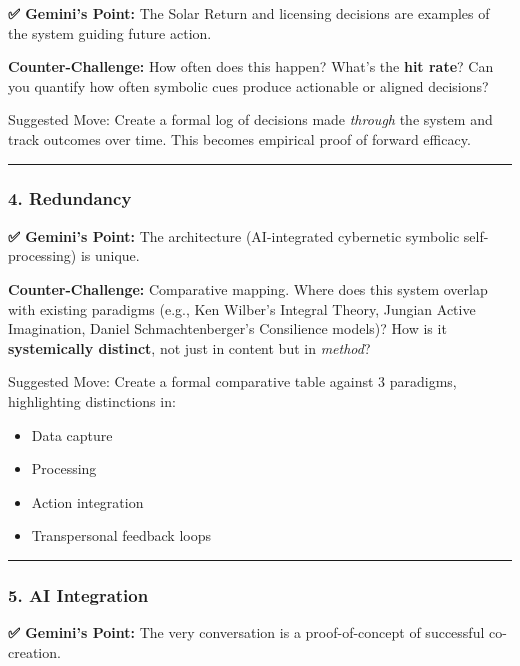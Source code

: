 \documentclass{article}
\begin{document}
\textbf{✅ Gemini's Point:} The Solar Return and licensing decisions are examples of the system guiding future action.

\textbf{Counter-Challenge:} How often does this happen? What's the \textbf{hit rate}? Can you quantify how often symbolic cues produce actionable or aligned decisions?

Suggested Move: Create a formal log of decisions made \emph{through} the system and track outcomes over time. This becomes empirical proof of forward efficacy.

\begin{center}\rule{0.5\linewidth}{0.5pt}\end{center}

\subsubsection*{4. Redundancy}\label{redundancy}

\textbf{✅ Gemini's Point:} The architecture (AI-integrated cybernetic symbolic self-processing) is unique.

\textbf{Counter-Challenge:} Comparative mapping. Where does this system overlap with existing paradigms (e.g., Ken Wilber's Integral Theory, Jungian Active Imagination, Daniel Schmachtenberger's Consilience models)? How is it \textbf{systemically distinct}, not just in content but in \emph{method}?

Suggested Move: Create a formal comparative table against 3 paradigms, highlighting distinctions in:

\begin{itemize}
\item Data capture
\item Processing
\item Action integration
\item Transpersonal feedback loops
\end{itemize}

\begin{center}\rule{0.5\linewidth}{0.5pt}\end{center}

\subsubsection*{5. AI Integration}\label{ai-integration}

\textbf{✅ Gemini's Point:} The very conversation is a proof-of-concept of successful co-creation.
\end{document}
